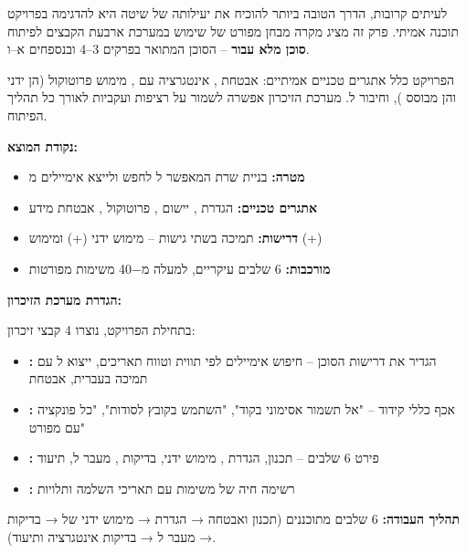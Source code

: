 

לעיתים קרובות, הדרך הטובה ביותר להוכיח את יעילותה של שיטה היא להדגימה בפרויקט תוכנה אמיתי. פרק זה מציג מקרה מבחן מפורט של שימוש במערכת ארבעת הקבצים לפיתוח \textbf{סוכן  מלא עבור } – הסוכן המתואר בפרקים \num{3}–\num{4} ובנספחים א–ו.

הפרויקט כלל אתגרים טכניים אמיתיים: אבטחת , אינטגרציה עם , מימוש פרוטוקול  (הן ידני והן מבוסס ), וחיבור ל. מערכת הזיכרון אפשרה לשמור על רציפות ועקביות לאורך כל תהליך הפיתוח.


\textbf{נקודת המוצא:}
\begin{itemize}
  \item \textbf{מטרה:} בניית שרת  המאפשר ל לחפש ולייצא אימיילים מ
  \item \textbf{אתגרים טכניים:} הגדרת , יישום , פרוטוקול , אבטחת מידע
  \item \textbf{דרישות:} תמיכה בשתי גישות – מימוש ידני (+) ומימוש  (+)
  \item \textbf{מורכבות:} \num{6} שלבים עיקריים, למעלה מ\num{-40} משימות מפורטות
\end{itemize}

\textbf{הגדרת מערכת הזיכרון:}

בתחילת הפרויקט, נוצרו \num{4} קבצי זיכרון:
\begin{itemize}
  \item \textbf{:} הגדיר את דרישות הסוכן – חיפוש אימיילים לפי תווית וטווח תאריכים, ייצוא ל עם תמיכה בעברית, אבטחת 
  \item \textbf{:} אכף כללי קידוד – "אל תשמור אסימוני  בקוד", "השתמש בקובץ  לסודות", "כל פונקציה עם  מפורט"
  \item \textbf{:} פירט \num{6} שלבים – תכנון, הגדרת , מימוש ידני, בדיקות , מעבר ל, תיעוד
  \item \textbf{:} רשימה חיה של משימות עם תאריכי השלמה ותלויות
\end{itemize}

\textbf{תהליך העבודה:} \num{6} שלבים מתוכננים (תכנון ואבטחה → הגדרת  → מימוש ידני של  → בדיקות  → מעבר ל → בדיקות אינטגרציה ותיעוד).

